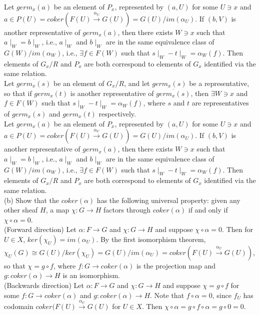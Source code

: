Let $germ_x(a)$ be an element of $P_x$, represented by $(a,U)$ for some $U \ni x$ and $a \in P(U)  = coker(F(U) \xrightarrow{\alpha_U} G(U)) = G(U)/im(\alpha_U)$. If $(b,V)$ is another representative of $germ_x(a)$, then there exists $W \ni x$ such that $a\mid_W = b\mid_W$, i.e., $a\mid_W$ and $b\mid_W$ are in the same equivalence class of $G(W)/im(\alpha_W)$, i.e., $\exists f \in F(W)$ such that $s\mid_W - t\mid_W = \alpha_W(f)$. Then elements of $G_x/R$ and $P_x$ are both correspond to elements of $G_x$ identified  via the same relation.\\


Let $\overline{germ_x(s)}$ be an element of $G_x/R$, and let $germ_x(s)$ be a representative, so that if $germ_x(t)$ is another representative of $\overline{germ_x(s)}$, then $\exists W \ni x$ and $f \in F(W)$ such that $s\mid_W - t\mid_W = \alpha_W(f)$, where $s$ and $t$ are representatives of $germ_x(s)$ and $germ_x(t)$ respectively.\\

Let $germ_x(a)$ be an element of $P_x$, represented by $(a,U)$ for some $U \ni x$ and $a \in P(U)  = coker(F(U) \xrightarrow{\alpha_U} G(U)) = G(U)/im(\alpha_U)$. If $(b,V)$ is another representative of $germ_x(a)$, then there exists $W \ni x$ such that $a\mid_W = b\mid_W$, i.e., $a\mid_W$ and $b\mid_W$ are in the same equivalence class of $G(W)/im(\alpha_W)$, i.e., $\exists f \in F(W)$ such that $s\mid_W - t\mid_W = \alpha_W(f)$. Then elements of $G_x/R$ and $P_x$ are both correspond to elements of $G_x$ identified  via the same relation.\\



(b) Show that the $coker(\alpha)$ has the following universal property: given any other sheaf $H$, a map $\chi: G \rightarrow H$ factors through $coker(\alpha)$ if and only if $\chi \circ \alpha = 0$.\\

(Forward direction) Let $\alpha:F \rightarrow G$ and $\chi:G \rightarrow H$ and suppose $\chi \circ \alpha =0$. Then for $U \in X$, $ker(\chi_U) = im(\alpha_U)$. By the first isomorphism theorem, $\chi_U(G) \cong G(U)/ker(\chi_U) = G(U)/im(\alpha_U) = coker(F(U) \xrightarrow{\alpha_U} G(U)) $, so that $\chi = g \circ f$, where $f:G \rightarrow coker(\alpha)$ is the projection map and $g:coker(\alpha) \rightarrow H$ is an isomorphism.\\

(Backwards direction) Let $\alpha:F \rightarrow G$ and $\chi:G \rightarrow H$ and suppose $\chi= g \circ f$ for some $f:G \rightarrow coker(\alpha)$ and $g:coker(\alpha) \rightarrow H$. Note that $f \circ \alpha = 0$, since $f_U$ has codomain $coker(F(U) \xrightarrow{\alpha_U} G(U)$ for $U \in X$. Then $\chi \circ \alpha = g \circ f \circ \alpha = g \circ 0 =0$.

